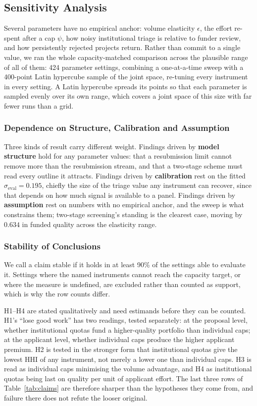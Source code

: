 \documentclass[11pt,a4paper]{article}
\begin{document}
\subsection{Sensitivity Analysis}
\label{sec:scan}

Several parameters have no empirical anchor: volume elasticity $\epsilon$, the
effort re-spent after a cap $\psi$, how noisy institutional triage is relative to
funder review, and how persistently rejected projects return. Rather than commit to a
single value, we ran the whole capacity-matched comparison across the plausible range of
all of them: 424 parameter settings, combining a one-at-a-time sweep with a
400-point Latin hypercube sample of the joint space, re-tuning every instrument in
every setting. A Latin hypercube spreads its points so that each parameter is
sampled evenly over its own range, which covers a joint space of this size with
far fewer runs than a grid.

\subsubsection{Dependence on Structure, Calibration and Assumption}

Three kinds of result carry different weight. Findings driven by \textbf{model
structure} hold for any parameter values: that a resubmission limit cannot remove
more than the resubmission stream, and that a two-stage scheme must read every
outline it attracts.
Findings driven by \textbf{calibration} rest on the fitted
$\sigma_{\text{eval}}=0.195$, chiefly the size of the triage value any instrument
can recover, since that depends on how much signal is available to a panel.
Findings driven by \textbf{assumption} rest on numbers with no empirical anchor,
and the sweep is what constrains them; two-stage screening's standing is the
clearest case, moving by $0.634$ in funded quality across the elasticity range.

\subsubsection{Stability of Conclusions}

We call a claim stable if it holds in at least 90\% of the settings able to
evaluate it. Settings where the named instruments cannot reach the capacity
target, or where the measure is undefined, are excluded rather than counted as
support, which is why the row counts differ.

H1--H4 are stated qualitatively and need estimands before they can be counted.
H1's ``lose good work'' has two readings, tested separately: at the proposal
level, whether institutional quotas fund a higher-quality portfolio than
individual caps; at the applicant level, whether individual caps produce the
higher applicant premium. H2 is tested in the stronger form that institutional
quotas give the lowest HHI of any instrument, not merely a lower one than
individual caps. H3 is read as individual caps minimising the volume advantage,
and H4 as institutional quotas being last on quality per unit of applicant
effort. The last three rows of Table~\ref{tab:claims} are therefore sharper than
the hypotheses they come from, and failure there does not refute the looser
original.
\end{document}
